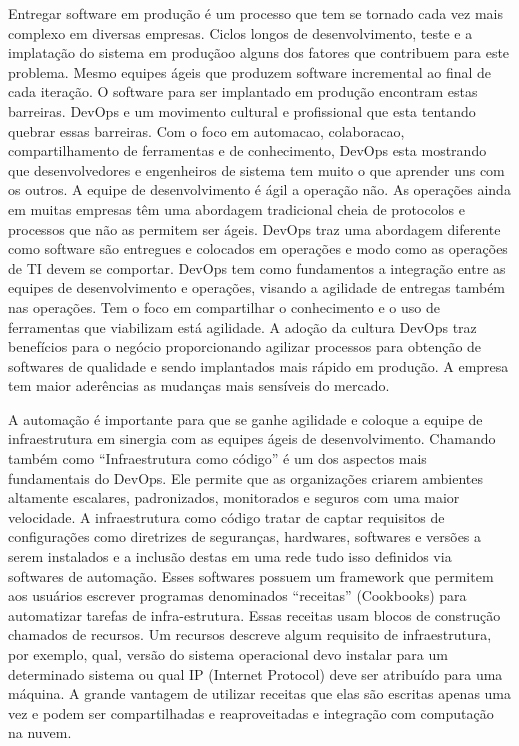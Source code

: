     Entregar software em produção é um processo que tem se tornado cada vez
mais complexo em diversas empresas. Ciclos longos de desenvolvimento,
teste e a implatação do sistema em produçãoo alguns
dos fatores que contribuem para este problema. Mesmo equipes ágeis que
produzem software incremental ao final de cada iteração. O software para ser implantado em produção encontram estas barreiras.
DevOps e um movimento cultural e profissional que esta tentando quebrar
essas barreiras. Com o foco em automacao, colaboracao, compartilhamento
de ferramentas e de conhecimento, DevOps esta mostrando que desenvolvedores
e engenheiros de sistema tem muito o que aprender uns com
os outros.
A equipe de desenvolvimento é ágil a operação não. As operações ainda em muitas empresas têm uma abordagem tradicional cheia de protocolos e processos que não as permitem ser ágeis.\cite{sato}
DevOps traz uma abordagem diferente como software são entregues e colocados em operações e modo como as operações de TI devem se comportar.   
DevOps tem como fundamentos a integração entre as equipes de desenvolvimento e operações, visando a agilidade de entregas também nas operações. Tem o foco em compartilhar o conhecimento e o uso de ferramentas que viabilizam está agilidade.
A adoção da cultura DevOps traz benefícios para o negócio proporcionando agilizar processos para obtenção de softwares de qualidade e sendo implantados mais rápido em produção. A empresa tem maior aderências as mudanças mais sensíveis do mercado.

A automação é importante para que se ganhe agilidade e coloque a equipe de infraestrutura em sinergia com as equipes ágeis de desenvolvimento.
Chamando também como “Infraestrutura como código” é um dos aspectos mais fundamentais do DevOps. Ele permite que as organizações criarem ambientes altamente escalares, padronizados, monitorados e seguros com uma maior velocidade. A infraestrutura como código tratar de captar requisitos de configurações como diretrizes de seguranças, hardwares, softwares e versões a serem instalados e a inclusão destas em uma rede tudo isso definidos via softwares de automação.
Esses softwares possuem um framework que permitem aos usuários escrever programas denominados “receitas” (Cookbooks) para automatizar tarefas de infra-estrutura. Essas receitas usam blocos de construção chamados de recursos. Um recursos descreve algum requisito de infraestrutura, por exemplo, qual, versão do sistema operacional devo instalar para um determinado sistema ou qual IP (Internet Protocol) deve ser atribuído para uma máquina.
A grande vantagem de utilizar receitas que elas são escritas apenas uma vez e podem ser compartilhadas e reaproveitadas e integração com computação na nuvem.


